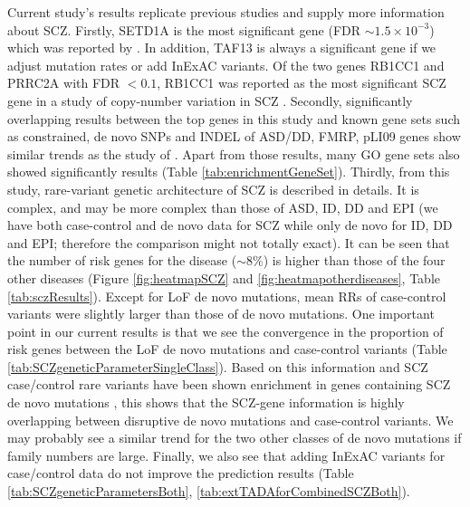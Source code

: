 \documentclass[]{article}
\begin{document}
Current study's results replicate previous studies and supply more
information about SCZ. Firstly, SETD1A is the most significant gene
(FDR $\sim 1.5 \times 10^{-3}$) which was reported by \cite{singh2016rare,
  takata2016novo}. In addition, TAF13 is always a significant gene if we
adjust mutation rates or add InExAC variants. Of the two genes RB1CC1
and PRRC2A with FDR $<0.1$, RB1CC1 was reported as the most significant SCZ gene in a
study of copy-number variation in SCZ
\citep{degenhardt2013duplications}. Secondly, significantly
overlapping results between the top genes in this study and known gene
sets such as constrained, de novo SNPs and INDEL of ASD/DD, FMRP, pLI09 genes
show similar trends as the study of
\cite{genovese2016increased}.  Apart
from those results, many GO gene sets also showed significantly results (Table
\ref{tab:enrichmentGeneSet}). Thirdly, from this study, rare-variant
genetic architecture of SCZ is described in details. It is complex,
and may be more complex than those of ASD, ID, DD and EPI (we
have both case-control and de novo data for SCZ while only de novo for
ID, DD and EPI; therefore the comparison might not totally exact). It can be seen
that the number of risk genes
for the disease ($\sim 8\%$) is higher than those of the four other diseases  (Figure \ref{fig:heatmapSCZ} and
\ref{fig:heatmapotherdiseases}, Table \ref{tab:sczResults}). Except
for LoF de novo mutations, mean RRs of case-control variants were
slightly larger than those of de novo mutations. One important point
in our current results is that we see the convergence in the
proportion of risk genes between the LoF de novo mutations and
case-control variants (Table \ref{tab:SCZgeneticParameterSingleClass}). Based on this information and SCZ case/control rare variants have been shown enrichment in genes containing SCZ de novo mutations \citep{genovese2016increased,purcell2014polygenic}, this shows that the SCZ-gene information
is highly overlapping between disruptive de novo mutations and case-control variants. We may probably see a similar trend for the two other classes of de novo mutations if family numbers are large. Finally, we
also see that adding InExAC variants for case/control data do not
improve the prediction results (Table
\ref{tab:SCZgeneticParametersBoth}, \ref{tab:extTADAforCombinedSCZBoth}).
\end{document}
